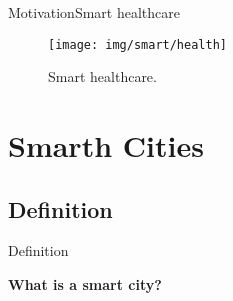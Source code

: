 \documentclass[10pt]{beamer}
\newcommand{\1}{
        	\setbeamertemplate{background}{
        		\texttt{[image: img/1]}
        		\tikz[overlay] \fill[fill opacity=0.75,fill=white] (0,0) rectangle (-\paperwidth,\paperheight);
        	}
}
\begin{document}
\begin{frame}{Motivation}{Smart healthcare}	
	\begin{figure}[]
		\texttt{[image: img/smart/health]}
		\caption{Smart healthcare.}
	\end{figure}
\end{frame}


\section{Smarth Cities}

\subsection{Definition}



\begin{frame}{Definition}{}
	\begin{block}{}
		\centering
		\textbf{What is a smart city?}
	\end{block}
\end{frame}
\end{document}
